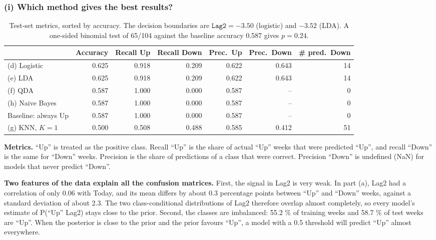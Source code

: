 \documentclass[11pt]{article}
\begin{document}
\subsubsection*{(i) Which method gives the best results?}

\begin{table}[H]
  \centering
  \small
  \setlength{\tabcolsep}{4pt}
  \begin{tabular}{lrrrrrr}
    \toprule
    & Accuracy & Recall Up & Recall Down & Prec.\ Up & Prec.\ Down & \# pred.\ Down \\
    \midrule
    (d) Logistic & 0.625 & 0.918 & 0.209 & 0.622 & 0.643 & 14 \\
    (e) LDA & 0.625 & 0.918 & 0.209 & 0.622 & 0.643 & 14 \\
    (f) QDA & 0.587 & 1.000 & 0.000 & 0.587 & -- & 0 \\
    (h) Naive Bayes & 0.587 & 1.000 & 0.000 & 0.587 & -- & 0 \\
    Baseline: always Up & 0.587 & 1.000 & 0.000 & 0.587 & -- & 0 \\
    (g) KNN, $K = 1$ & 0.500 & 0.508 & 0.488 & 0.585 & 0.412 & 51 \\
    \bottomrule
  \end{tabular}
  \caption{Test-set metrics, sorted by accuracy. The decision boundaries are $\texttt{Lag2} = -3.50$ (logistic) and $-3.52$ (LDA). A one-sided binomial test of 65/104 against the baseline accuracy 0.587 gives $p = 0.24$.}
\end{table}

\textbf{Metrics.} ``Up'' is treated as the positive class. Recall ``Up'' is the share of actual ``Up'' weeks that were predicted ``Up'', and recall ``Down'' is the same for ``Down'' weeks. Precision is the share of predictions of a class that were correct. Precision ``Down'' is undefined (NaN) for models that never predict ``Down''.

\textbf{Two features of the data explain all the confusion matrices.} First, the signal in Lag2 is very weak. In part (a), Lag2 had a correlation of only 0.06 with Today, and its mean differs by about 0.3 percentage points between ``Up'' and ``Down'' weeks, against a standard deviation of about 2.3. The two class-conditional distributions of Lag2 therefore overlap almost completely, so every model's estimate of P(``Up'' \textbar{} Lag2) stays close to the prior. Second, the classes are imbalanced: 55.2 \% of training weeks and 58.7 \% of test weeks are ``Up''. When the posterior is close to the prior and the prior favours ``Up'', a model with a 0.5 threshold will predict ``Up'' almost everywhere.
\end{document}
